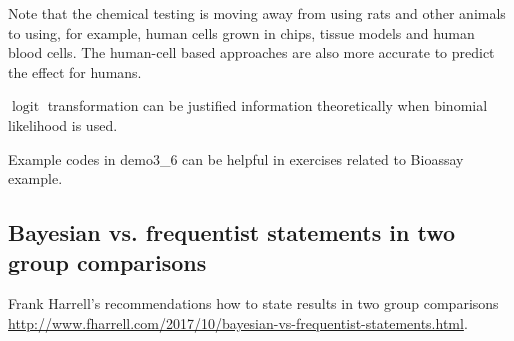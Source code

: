 \documentclass[a4paper,11pt,english]{article}
\DeclareMathOperator{\logit}{logit}
\begin{document}
Note that the chemical testing is moving away from using rats and
other animals to using, for example, human cells grown in chips,
tissue models and human blood cells. The human-cell based approaches
are also more accurate to predict the effect for humans.

$\logit$ transformation can be justified information theoretically
when binomial likelihood is used.

Example codes in demo3\_6 can be helpful in exercises related to
Bioassay example.

\subsection*{Bayesian vs. frequentist statements in two group comparisons}

Frank Harrell's recommendations how to state results in two group
comparisons
\url{http://www.fharrell.com/2017/10/bayesian-vs-frequentist-statements.html}.
\end{document}
